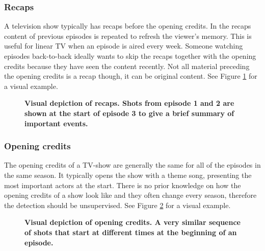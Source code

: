 \documentclass{report}
\begin{document}
\subsubsection{Recaps}
A television show typically has recaps before the opening credits. In the recaps content of previous episodes is repeated to refresh the viewer's memory. This is useful for linear TV when an episode is aired every week. Someone watching episodes back-to-back ideally wants to skip the recaps together with the opening credits because they have seen the content recently. Not all material preceding the opening credits is a recap though, it can be original content. See Figure \ref{fig:contextrecaps} for a visual example.

\begin{figure}[H]
	\caption{\textbf{Visual depiction of recaps. Shots from episode 1 and 2 are shown at the start of episode 3 to give a brief summary of important events.}}
	\label{fig:contextrecaps}
\end{figure}

\subsubsection{Opening credits}
The opening credits of a TV-show are generally the same for all of the episodes in the same season. It typically opens the show with a theme song, presenting the most important actors at the start. There is no prior knowledge on how the opening credits of a show look like and they often change every season, therefore the detection should be unsupervised. See Figure \ref{fig:contextopeningcredits} for a visual example.

\begin{figure}[H]
	\caption{\textbf{Visual depiction of opening credits. A very similar sequence of shots that start at different times at the beginning of an episode.}}
	\label{fig:contextopeningcredits}
\end{figure}
\end{document}
